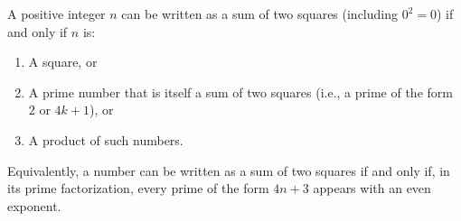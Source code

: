 A positive integer $n$ can be written as a sum of two squares (including $0^2 = 0$) if and only if $n$ is:
\begin{enumerate}
\item A square, or
\item A prime number that is itself a sum of two squares (i.e., a prime of the form $2$ or $4k+1$), or
\item A product of such numbers.
\end{enumerate}

Equivalently, a number can be written as a sum of two squares if and only if, in its prime factorization, every prime of the form $4n+3$ appears with an even exponent.

